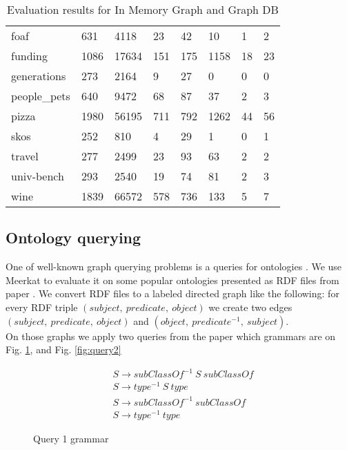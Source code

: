 \begin{table*}[t]
\begin{tabular}{|l|l|lll|lll|}
foaf                        & 631  & 4118  & 23  & 42  & 10   & 1  & 2  \\
funding                     & 1086 & 17634 & 151 & 175 & 1158 & 18 & 23 \\
generations                 & 273  & 2164  & 9   & 27  & 0    & 0  & 0  \\
people\_pets                & 640  & 9472  & 68  & 87  & 37   & 2  & 3  \\
pizza                       & 1980 & 56195 & 711 & 792 & 1262 & 44 & 56 \\
skos                        & 252  & 810   & 4   & 29  & 1    & 0  & 1  \\
travel                      & 277  & 2499  & 23  & 93  & 63   & 2  & 2  \\
univ-bench                  & 293  & 2540  & 19  & 74  & 81   & 2  & 3  \\
wine                        & 1839 & 66572 & 578 & 736 & 133  & 5  & 7  \\
\hline
\end{tabular}
\caption{Evaluation results for In Memory Graph and Graph DB}
\label{table:rdfs}
\end{table*}

\subsection{Ontology querying}
\label{sec:ontology}

One of well-known graph querying problems is a queries for ontologies \cite{FndDB}. We use Meerkat to evaluate
it on some popular ontologies presented as RDF files from paper \cite{CFGonRDF}. We convert RDF files to a labeled directed graph like the following: for every RDF triple $(subject,\ predicate,\ object)$ we create two edges $(subject,\ predicate,\ object)$ and $(object,\ predicate^{-1},\ subject)$.\\
On those graphs we apply two queries from the paper \cite{GrigorevR16} which grammars are on Fig. \ref{fig:query1}, and Fig.  \ref{fig:query2} 
\begin{figure}[h]
\begin{align*}
& S \rightarrow subClassOf^{-1}\ S\ subClassOf\\
& S \rightarrow type^{-1}\ S\ type\\
& S \rightarrow subClassOf^{-1}\ subClassOf\\
& S \rightarrow type^{-1}\ type
\end{align*}
\caption{Query 1 grammar}
\label{fig:query1}
\end{figure}


